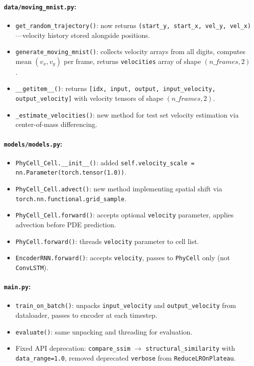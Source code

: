 \documentclass[11pt,a4paper]{article}
\begin{document}
\paragraph{\texttt{data/moving\_mnist.py}:}
\begin{itemize}[nosep]
    \item \texttt{get\_random\_trajectory()}: now returns \texttt{(start\_y, start\_x, vel\_y, vel\_x)}---velocity history stored alongside positions.
    \item \texttt{generate\_moving\_mnist()}: collects velocity arrays from all digits, computes mean $(v_x, v_y)$ per frame, returns \texttt{velocities} array of shape $(n\_frames, 2)$.
    \item \texttt{\_\_getitem\_\_()}: returns \texttt{[idx, input, output, input\_velocity, output\_velocity]} with velocity tensors of shape $(n\_frames, 2)$.
    \item \texttt{\_estimate\_velocities()}: new method for test set velocity estimation via center-of-mass differencing.
\end{itemize}

\paragraph{\texttt{models/models.py}:}
\begin{itemize}[nosep]
    \item \texttt{PhyCell\_Cell.\_\_init\_\_()}: added \texttt{self.velocity\_scale = nn.Parameter(torch.tensor(1.0))}.
    \item \texttt{PhyCell\_Cell.advect()}: new method implementing spatial shift via \texttt{torch.nn.functional.grid\_sample}.
    \item \texttt{PhyCell\_Cell.forward()}: accepts optional \texttt{velocity} parameter, applies advection before PDE prediction.
    \item \texttt{PhyCell.forward()}: threads \texttt{velocity} parameter to cell list.
    \item \texttt{EncoderRNN.forward()}: accepts \texttt{velocity}, passes to \texttt{PhyCell} only (not \texttt{ConvLSTM}).
\end{itemize}

\paragraph{\texttt{main.py}:}
\begin{itemize}[nosep]
    \item \texttt{train\_on\_batch()}: unpacks \texttt{input\_velocity} and \texttt{output\_velocity} from dataloader, passes to encoder at each timestep.
    \item \texttt{evaluate()}: same unpacking and threading for evaluation.
    \item Fixed API deprecation: \texttt{compare\_ssim} $\to$ \texttt{structural\_similarity} with \texttt{data\_range=1.0}, removed deprecated \texttt{verbose} from \texttt{ReduceLROnPlateau}.
\end{itemize}
\end{document}
